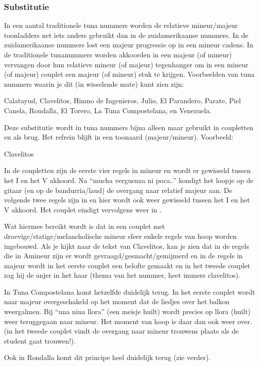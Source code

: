 \subsubsection*{Substitutie}
In een aantal traditionele tuna nummers worden de relatieve mineur/majeur toonladders net iets anders gebruikt dan in de zuidamerikaanse nummers. In de zuidamerikaanse nummers lost een majeur progressie op in een mineur cadens. In de traditionele tunanummers worden akkoorden in een majeur (of mineur) vervangen door hun relatieve mineur (of majeur) tegenhanger om in een mineur (of majeur) couplet een majeur (of mineur) stuk te krijgen. Voorbeelden van tuna nummers waarin je dit (in wisselende mate) kunt zien zijn:

Calatayud, Clavelitos, Himno de Ingenieros, Julio, El Parandero, Parate, Piel Canela, Rondalla, El Torero, La Tuna Compostelana, en Venezuela.

Deze substitutie wordt in tuna nummers bijna alleen maar gebruikt in coupletten en als brug. Het refrein blijft in een toonaard (majeur/mineur). Voorbeeld: 

Clavelitos

In de coupletten zijn de eerste vier regels in mineur en wordt er gewisseld tussen het I en het V akkoord. Na “mucha verguenza ni poca..” kondigt het loopje op de gitaar (en op de bandurria/laud) de overgang naar relatief majeur aan. De volgende twee regels zijn in  en hier wordt ook weer gewisseld tussen het I en het V akkoord. Het couplet eindigt vervolgens weer in .

Wat hiermee bereikt wordt is dat in een couplet met droevige/statige/melancholische mineur sfeer enkele regels van hoop worden ingebouwd. Als je kijkt naar de tekst van Clavelitos, kan je zien dat in de regels die in Amineur zijn er wordt gevraagd/gesmacht/gemijmerd en in de regels in majeur wordt in het eerste couplet een belofte gemaakt en in het tweede couplet zag hij de anjer in het haar (thema van het nummer, heet immers clavelitos). 

In Tuna Compostelana komt hetzelfde duidelijk terug. In het eerste couplet wordt naar majeur overgeschakeld op het moment dat de liedjes over het balkon weergalmen. Bij “una nina llora” (een meisje huilt) wordt precies op llora (huilt) weer teruggegaan naar mineur. Het moment van hoop is daar dan ook weer over. (in het tweede couplet vindt de overgang naar mineur trouwens plaats als de student gaat trouwen!).

Ook in Rondalla komt dit principe heel duidelijk terug (zie verder).

